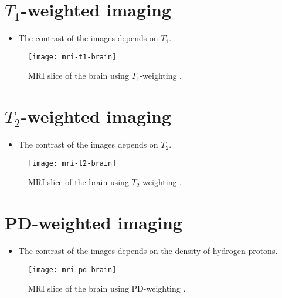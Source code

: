 \section{$T_1$-weighted imaging}
\begin{itemize}
\item The contrast of the images depends on $T_1$.
\end{itemize}
\vspace{-3ex}
\begin{figure}[!b]
  \centering
  \texttt{[image: mri-t1-brain]}
  \caption{MRI slice of the brain using $T_1$-weighting \cite{abdulla2025MRI_weighting}.}
  \label{fig:MRI-T1-weighting}
\end{figure}

\section{$T_2$-weighted imaging}
\begin{itemize}
\item The contrast of the images depends on $T_2$.
\end{itemize}
\vspace{-3ex}
\begin{figure}[!b]
  \centering
  \texttt{[image: mri-t2-brain]}
  \caption{MRI slice of the brain using $T_2$-weighting \cite{abdulla2025MRI_weighting}.}
  \label{fig:MRI-T2-weighting}
\end{figure}

\section{PD-weighted imaging}
\begin{itemize}
\item The contrast of the images depends on the density of hydrogen
  protons.
\end{itemize}
\vspace{-3ex}
\begin{figure}[!b]
  \centering
  \texttt{[image: mri-pd-brain]}
  \caption{MRI slice of the brain using PD-weighting \cite{abdulla2025MRI_weighting}.}
  \label{fig:MRI-PD-weighting}
\end{figure}

